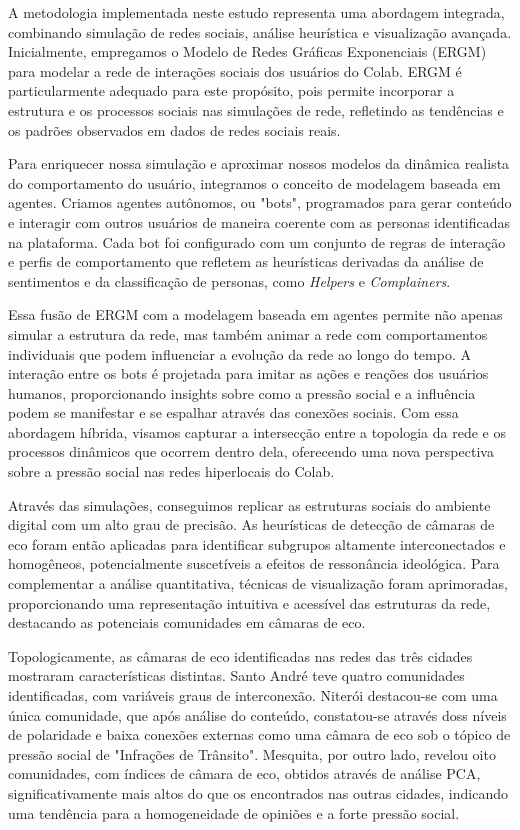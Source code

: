 A metodologia implementada neste estudo representa uma abordagem integrada, combinando simulação de redes sociais, análise heurística e visualização avançada. Inicialmente, empregamos o Modelo de Redes Gráficas Exponenciais (ERGM) para modelar a rede de interações sociais dos usuários do Colab. ERGM é particularmente adequado para este propósito, pois permite incorporar a estrutura e os processos sociais nas simulações de rede, refletindo as tendências e os padrões observados em dados de redes sociais reais.

Para enriquecer nossa simulação e aproximar nossos modelos da dinâmica realista do comportamento do usuário, integramos o conceito de modelagem baseada em agentes. Criamos agentes autônomos, ou "bots", programados para gerar conteúdo e interagir com outros usuários de maneira coerente com as personas identificadas na plataforma. Cada bot foi configurado com um conjunto de regras de interação e perfis de comportamento que refletem as heurísticas derivadas da análise de sentimentos e da classificação de personas, como \textit{Helpers} e \textit{Complainers}.

Essa fusão de ERGM com a modelagem baseada em agentes permite não apenas simular a estrutura da rede, mas também animar a rede com comportamentos individuais que podem influenciar a evolução da rede ao longo do tempo. A interação entre os bots é projetada para imitar as ações e reações dos usuários humanos, proporcionando insights sobre como a pressão social e a influência podem se manifestar e se espalhar através das conexões sociais. Com essa abordagem híbrida, visamos capturar a intersecção entre a topologia da rede e os processos dinâmicos que ocorrem dentro dela, oferecendo uma nova perspectiva sobre a pressão social nas redes hiperlocais do Colab.

Através das simulações, conseguimos replicar as estruturas sociais do ambiente digital com um alto grau de precisão. As heurísticas de detecção de câmaras de eco foram então aplicadas para identificar subgrupos altamente interconectados e homogêneos, potencialmente suscetíveis a efeitos de ressonância ideológica. Para complementar a análise quantitativa, técnicas de visualização foram aprimoradas, proporcionando uma representação intuitiva e acessível das estruturas da rede, destacando as potenciais comunidades em câmaras de eco.

Topologicamente, as câmaras de eco identificadas nas redes das três cidades mostraram características distintas. Santo André teve quatro comunidades identificadas, com variáveis graus de interconexão. Niterói destacou-se com uma única comunidade, que após análise do conteúdo, constatou-se através doss níveis de polaridade e baixa conexões externas como uma câmara de eco sob o tópico de pressão social  de "Infrações de Trânsito". Mesquita, por outro lado, revelou oito comunidades, com índices de câmara de eco, obtidos através de análise PCA, significativamente mais altos do que os encontrados nas outras cidades, indicando uma tendência para a homogeneidade de opiniões e a forte pressão social. 

